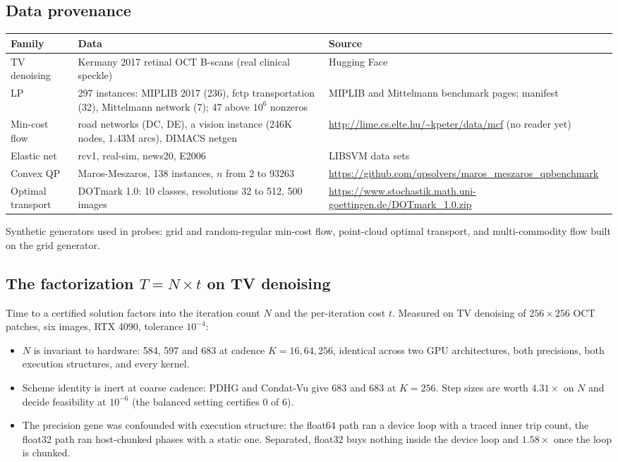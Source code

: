 \subsection{Data provenance}
\label{app:log:data}

\begin{center}
\small
\begin{tabular}{p{2.3cm}p{4.6cm}p{5.6cm}}
\toprule
Family & Data & Source \\
\midrule
TV denoising & Kermany 2017 retinal OCT B-scans (real clinical speckle) &
 Hugging Face \\
LP & 297 instances: MIPLIB 2017 (236), fctp transportation (32), Mittelmann
 network (7); 47 above $10^6$ nonzeros & MIPLIB and Mittelmann benchmark
 pages; manifest \\
Min-cost flow & road networks (DC, DE), a vision instance (246K nodes, 1.43M
 arcs), DIMACS netgen & \url{http://lime.cs.elte.hu/~kpeter/data/mcf}
 (no reader yet) \\
Elastic net & rcv1, real-sim, news20, E2006 & LIBSVM data sets \\
Convex QP & Maros-Meszaros, 138 instances, $n$ from 2 to 93263 &
 \url{https://github.com/qpsolvers/maros_meszaros_qpbenchmark} \\
Optimal transport & DOTmark 1.0: 10 classes, resolutions 32 to 512, 500
 images & \url{https://www.stochastik.math.uni-goettingen.de/DOTmark_1.0.zip} \\
\bottomrule
\end{tabular}
\end{center}

Synthetic generators used in probes: grid and random-regular min-cost flow,
point-cloud optimal transport, and multi-commodity flow built on the grid
generator.

\subsection{The factorization $T = N \times t$ on TV denoising}
\label{app:log:factorisation}

Time to a certified solution factors into the iteration count $N$ and the
per-iteration cost $t$. Measured on TV denoising of $256\times256$ OCT
patches, six images, RTX 4090, tolerance $10^{-4}$:

\begin{itemize}
\item $N$ is invariant to hardware: 584, 597 and 683 at cadence $K=16, 64,
 256$, identical across two GPU architectures, both precisions, both
 execution structures, and every kernel.
\item Scheme identity is inert at coarse cadence: PDHG and Condat-Vu give 683
 and 683 at $K=256$. Step sizes are worth $4.31\times$ on $N$ and decide
 feasibility at $10^{-6}$ (the balanced setting certifies 0 of 6).
\item The precision gene was confounded with execution structure: the
 float64 path ran a device loop with a traced inner trip count, the float32
 path ran host-chunked phases with a static one. Separated, float32 buys
 nothing inside the device loop and $1.58\times$ once the loop is chunked.
\end{itemize}


